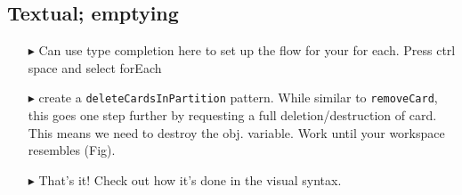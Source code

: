 \newpage
\subsection{Textual; emptying}
\texHeader
\hypertarget{emptyPartition tex}{}

\texttt{}
\emph{}

\begin{itemize}
 
\item[$\blacktriangleright$] Can use type completion here to set up the flow for your for each. Press ctrl space and select forEach

\item[$\blacktriangleright$] create a \texttt{deleteCardsInPartition} pattern. While similar to \texttt{removeCard}, this goes one step further by requesting a
full deletion/destruction of card. This means we need to destroy the obj. variable. Work until your workspace resembles (Fig).

\item[$\blacktriangleright$] That's it! Check out how it's done in the visual syntax.

\end{itemize}
